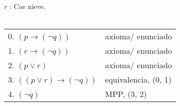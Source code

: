\documentclass{article}
\begin{document}
\begin{itemize}
\begin{itemize}
\begin{center}
				      $r$ : Cae nieve.\\
				      \makebox[6.5cm]{\hrulefill}\\
				      \begin{NiceTabular}{l l}
					      0. $(p \rightarrow (\lnot q))$          & axioma/ enunciado    \\
					      1. $(r \rightarrow (\lnot q))$          & axioma/ enunciado    \\
					      2. $(p \vee r)$                         & axioma/ enunciado    \\
					      3. $((p \vee r) \rightarrow (\lnot q))$ & equivalencia, (0, 1) \\
					      4. $(\lnot q)$                          & MPP, (3, 2)
				      \end{NiceTabular}
			      \end{center}
	      \end{itemize}
\end{itemize}
\end{document}
